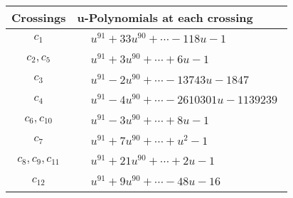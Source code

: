 \documentclass[1p]{elsarticle_modified}
\theoremstyle{definition}
\begin{document}
\begin{tabular}{m{50pt}|m{274pt}}
Crossings & \hspace{64pt}u-Polynomials at each crossing \\
\hline $$\begin{aligned}c_{1}\end{aligned}$$&$\begin{aligned}
&u^{91}+33 u^{90}+\cdots-118 u-1
\end{aligned}$\\
\hline $$\begin{aligned}c_{2},c_{5}\end{aligned}$$&$\begin{aligned}
&u^{91}+3 u^{90}+\cdots+6 u-1
\end{aligned}$\\
\hline $$\begin{aligned}c_{3}\end{aligned}$$&$\begin{aligned}
&u^{91}-2 u^{90}+\cdots-13743 u-1847
\end{aligned}$\\
\hline $$\begin{aligned}c_{4}\end{aligned}$$&$\begin{aligned}
&u^{91}-4 u^{90}+\cdots-2610301 u-1139239
\end{aligned}$\\
\hline $$\begin{aligned}c_{6},c_{10}\end{aligned}$$&$\begin{aligned}
&u^{91}-3 u^{90}+\cdots+8 u-1
\end{aligned}$\\
\hline $$\begin{aligned}c_{7}\end{aligned}$$&$\begin{aligned}
&u^{91}+7 u^{90}+\cdots+u^2-1
\end{aligned}$\\
\hline $$\begin{aligned}c_{8},c_{9},c_{11}\end{aligned}$$&$\begin{aligned}
&u^{91}+21 u^{90}+\cdots+2 u-1
\end{aligned}$\\
\hline $$\begin{aligned}c_{12}\end{aligned}$$&$\begin{aligned}
&u^{91}+9 u^{90}+\cdots-48 u-16
\end{aligned}$\\
\hline
\end{tabular}\\~\\
\end{document}
